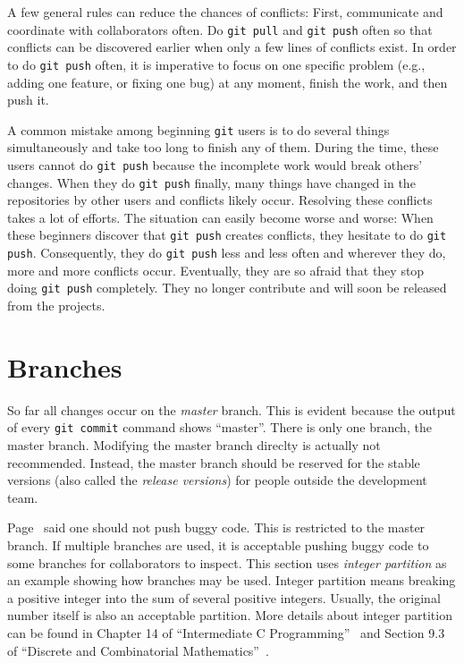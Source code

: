 A few general rules can reduce the chances of conflicts:
First,  communicate and coordinate with collaborators often.
Do {\tt git pull} and {\tt git push} often so that conflicts can
  be discovered earlier when only a few lines of conflicts exist.
 In order to do {\tt git push} often, it is imperative to focus
  on one specific problem (e.g., adding one feature, or fixing one
  bug) at any moment, finish the work, and then push it.


  A common mistake among beginning {\tt git} users is to do several
  things simultaneously and take too long to finish any of them.
  During the time, these users cannot do {\tt git push} because the
  incomplete work would break others' changes. When they do {\tt git
    push} finally, many things have changed in the repositories by
  other users and conflicts likely occur. Resolving these conflicts
  takes a lot of efforts.  The situation can easily become worse and
  worse: When these beginners discover that {\tt git push} creates
  conflicts, they hesitate to do {\tt git push}. Consequently, they do
  {\tt git push} less and less often and wherever they do, more and
  more conflicts occur.  Eventually, they are so afraid that they stop
  doing {\tt git push} completely. They no longer contribute and will
  soon be released from the projects.

\section{Branches}
\label{section:git:branches}

So far all changes occur on the {\it master} branch. This is evident
because the output of every {\tt git commit} command shows ``master''.
There is only one branch, the master branch.  Modifying the master
branch direclty is actually not recommended. Instead, the master
branch should be reserved for the stable versions (also called the
{\it release versions}) for people outside the development team.

 Page~\pageref{page:whengitpush} said one
should not push buggy code. This is restricted to the master branch.
If multiple branches are used, it is acceptable pushing buggy code to
some branches for collaborators to inspect.  This section uses {\it
  integer partition} as an example showing how branches may be
used. Integer partition means breaking a positive integer into the sum
of several positive integers. Usually, the original number itself is
also an acceptable partition. More details about integer partition can
be found in Chapter 14 of ``Intermediate C
Programming''~\cite{Lu2015IntermediateCProgramming} and Section 9.3 of
``Discrete and Combinatorial
Mathematics''~\cite{Grimaldi2003DiscreteandCombinatorial}.


